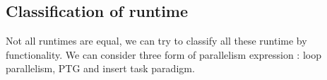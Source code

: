 \subsection{Classification of runtime}
Not all runtimes are equal, we can try to classify all these runtime by functionality.
%
We can consider three form of parallelism expression : loop parallelism, PTG and insert task paradigm.
%


